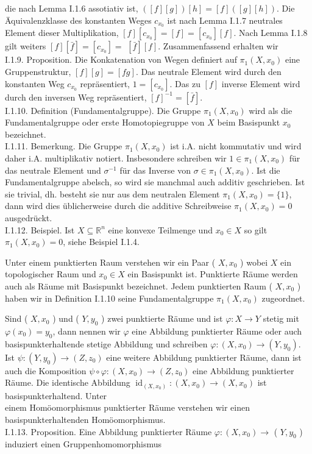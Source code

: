 \documentclass[10pt]{article}
\begin{document}
die nach Lemma I.1.6 assotiativ ist, $([f][g])[h]=[f]([g][h])$. Die Äquivalenzklasse des konstanten Weges $c_{x_{0}}$ ist nach Lemma I.1.7 neutrales Element dieser Multiplikation, $[f]\left[c_{x_{0}}\right]=[f]=\left[c_{x_{0}}\right][f]$. Nach Lemma I.1.8 gilt weiters $[f][\bar{f}]=\left[c_{x_{0}}\right]=$ $[\bar{f}][f]$. Zusammenfassend erhalten wir\\
I.1.9. Proposition. Die Konkatenation von Wegen definiert auf $\pi_{1}\left(X, x_{0}\right)$ eine Gruppenstruktur, $[f][g]=[f g]$. Das neutrale Element wird durch den konstanten Weg $c_{x_{0}}$ repräsentiert, $1=\left[c_{x_{0}}\right]$. Das zu $[f]$ inverse Element wird durch den inversen Weg repräsentiert, $[f]^{-1}=[\bar{f}]$.\\
I.1.10. Definition (Fundamentalgruppe). Die Gruppe $\pi_{1}\left(X, x_{0}\right)$ wird als die Fundamentalgruppe oder erste Homotopiegruppe von $X$ beim Basispunkt $x_{0}$ bezeichnet.\\
I.1.11. Bemerkung. Die Gruppe $\pi_{1}\left(X, x_{0}\right)$ ist i.A. nicht kommutativ und wird daher i.A. multiplikativ notiert. Insbesondere schreiben wir $1 \in \pi_{1}\left(X, x_{0}\right)$ für das neutrale Element und $\sigma^{-1}$ für das Inverse von $\sigma \in \pi_{1}\left(X, x_{0}\right)$. Ist die Fundamentalgruppe abelsch, so wird sie manchmal auch additiv geschrieben. Ist sie trivial, dh. besteht sie nur aus dem neutralen Element $\pi_{1}\left(X, x_{0}\right)=\{1\}$, dann wird dies üblicherweise durch die additive Schreibweise $\pi_{1}\left(X, x_{0}\right)=0$ ausgedrückt.\\
I.1.12. Beispiel. Ist $X \subseteq \mathbb{R}^{n}$ eine konvexe Teilmenge und $x_{0} \in X$ so gilt $\pi_{1}\left(X, x_{0}\right)=0$, siehe Beispiel I.1.4.

Unter einem punktierten Raum verstehen wir ein Paar ( $X, x_{0}$ ) wobei $X$ ein topologischer Raum und $x_{0} \in X$ ein Basispunkt ist. Punktierte Räume werden auch als Räume mit Basispunkt bezeichnet. Jedem punktierten Raum ( $X, x_{0}$ ) haben wir in Definition I.1.10 seine Fundamentalgruppe $\pi_{1}\left(X, x_{0}\right)$ zugeordnet.

Sind ( $X, x_{0}$ ) und ( $Y, y_{0}$ ) zwei punktierte Räume und ist $\varphi: X \rightarrow Y$ stetig mit $\varphi\left(x_{0}\right)=y_{0}$, dann nennen wir $\varphi$ eine Abbildung punktierter Räume oder auch basispunkterhaltende stetige Abbildung und schreiben $\varphi:\left(X, x_{0}\right) \rightarrow\left(Y, y_{0}\right)$. Ist $\psi:\left(Y, y_{0}\right) \rightarrow\left(Z, z_{0}\right)$ eine weitere Abbildung punktierter Räume, dann ist auch die Komposition $\psi \circ \varphi:\left(X, x_{0}\right) \rightarrow\left(Z, z_{0}\right)$ eine Abbildung punktierter Räume. Die identische Abbildung $\operatorname{id}_{\left(X, x_{0}\right)}:\left(X, x_{0}\right) \rightarrow\left(X, x_{0}\right)$ ist basispunkterhaltend. Unter\\
einem Homöomorphismus punktierter Räume verstehen wir einen basispunkterhaltenden Homöomorphismus.\\
I.1.13. Proposition. Eine Abbildung punktierter Räume $\varphi:\left(X, x_{0}\right) \rightarrow$ ( $Y, y_{0}$ ) induziert einen Gruppenhomomorphismus
\end{document}
